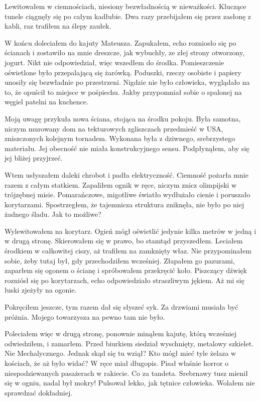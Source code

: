 Lewitowałem w ciemnościach, niesiony bezwładnością w nieważkości.
Kluczące tunele ciągnęły się po całym kadłubie.
Dwa razy przebijałem się przez zasłonę z kabli, raz trafiłem na ślepy zaułek.

W końcu doleciałem do kajuty Mateusza. 
Zapukałem, echo rozniosło się po ścianach i zostawiło na mnie dreszcze, jak wybuchły, ze złej strony otworzony, jogurt.
Nikt nie odpowiedział, więc wszedłem do środka.
Pomieszczenie oświetlone było przepalającą się żarówką.
Poduszki, rzeczy osobiste i papiery unosiły się bezwładnie po przestrzeni.
Nigdzie nie było człowieka, wyglądało na to, że opuścił to miejsce w pośpiechu.
Jakby przypomniał sobie o spalonej na węgiel patelni na kuchence.

Moją uwagę przykuła nowa ściana, stojąca na środku pokoju.
Była samotna, niczym murowany dom na tekturowych zgliszczach przedmieść w USA, zniszczonych kolejnym tornadem.
Wykonana była z dziwnego, srebrzystego materiału.
Jej obecność nie miała konstrukcyjnego sensu.
Podpłynąłem, aby się jej bliżej przyjrzeć.

Wtem usłyszałem daleki chrobot i padła elektryczność.
Ciemność pożarła mnie razem z całym statkiem.
Zapaliłem ognik w ręce, niczym znicz olimpijski w trójzębnej misie. Pomarańczowe, migotliwe światło wydłużało cienie i poruszało korytarzami.
Spostrzegłem, że tajemnicza struktura zniknęła, nie było po niej żadnego śladu.
Jak to możliwe?

Wylewitowałem na korytarz.
Ogień mógł oświetlić jedynie kilka metrów w jedną i w drugą stronę.
Skierowałem się w prawo, bo stamtąd przyszedłem.
Leciałem środkiem w całkowitej ciszy, aż trafiłem na zamknięty właz. 
Nie przypominałem sobie, żeby tutaj był, gdy przechodziłem wcześniej.
Złapałem go pazurami, zaparłem się ogonem o ścianę i spróbowałem przekręcić koło. 
Piszczący dźwięk rozniósł się po korytarzach, echo odpowiedziało straszliwym jękiem. 
Aż mi się łuski zjeżyły na ogonie.

Pokręciłem jeszcze, tym razem dał się słyszeć syk. 
Za drzwiami musiała być próżnia.
Mojego towarzysza na pewno tam nie było.

Poleciałem więc w drugą stronę, ponownie minąłem kajutę, którą wcześniej odwiedziłem, i zamarłem.
Przed biurkiem siedział wyschnięty, metalowy szkielet. Nie Mechalycznego.
Jednak skąd się tu wziął? Kto mógł mieć tyle żelaza w kościach, że aż było widać?
W ręce miał długopis. Pisał właśnie horror o niespodziewanych pasażerach w rakiecie. Co za tandeta.
Srebrnawy tusz mienił się w ogniu, nadal był mokry! Pulsował lekko, jak tętnice człowieka. Wolałem nie sprawdzać dokładniej.

